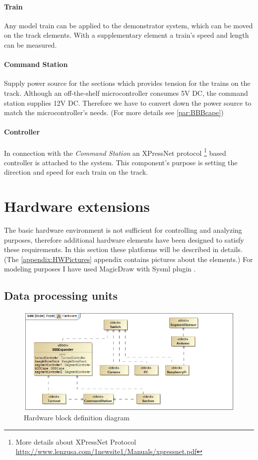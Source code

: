 \paragraph{Train}
Any model train can be applied to the demonstrator system, which can be moved on the track elements. With a supplementary element a train's speed and length can be measured.

\paragraph{Command Station} \label{basics:CS}
Supply power source for the sections which provides tension for the trains on the track. Although an off-the-shelf microcontroller consumes 5V DC, the command station supplies 12V DC. Therefore we have to convert down the power source to match the microcontroller's needs. (For more details see \autoref{par:BBBcape})

\paragraph{Controller}
In connection with the \textit{Command Station} an XPressNet protocol \footnote{More details about XPressNet Protocol \url{http://www.lenzusa.com/1newsite1/Manuals/xpressnet.pdf}} based controller is attached to the system. This component's purpose is setting the direction and speed for each train on the track.

\section{Hardware extensions}
The basic hardware environment is not sufficient for controlling and analyzing purposes, therefore additional hardware elements have been designed to satisfy these requirements. In this section these platforms will be described in details. (The \ref{appendix:HWPictures} appendix contains pictures about the elements.)
For modeling purposes I have used MagicDraw with Sysml plugin \cite{SysML}.

\subsection{Data processing units}
\begin{figure}[h]
	\centering
	\includegraphics[width=150mm]{figures/modes3/Hardware.png}
	\caption{Hardware block definition diagram}
	\label{fig:Modes3HWBDD}
\end{figure}

